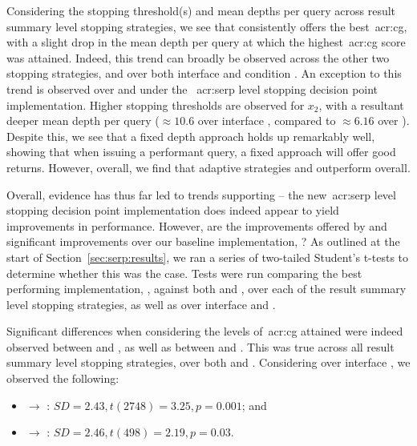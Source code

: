 Considering the stopping threshold(s) and mean depths per query across result summary level stopping strategies, we see that  consistently offers the best~\gls{acr:cg}, with a slight drop in the mean depth per query at which the highest~\gls{acr:cg} score was attained. Indeed, this trend can broadly be observed across the other two stopping strategies, and over both interface  and condition . An exception to this trend is observed over  and  under the ~\gls{acr:serp} level stopping decision point implementation. Higher stopping thresholds are observed for $x_2$, with a resultant deeper mean depth per query ($\approx10.6$ over interface , compared to $\approx6.16$ over ). Despite this, we see that a fixed depth approach holds up remarkably well, showing that when issuing a performant query, a fixed approach will offer good returns. However, overall, we find that adaptive strategies  and  outperform  overall.

Overall, evidence has thus far led to trends supporting  -- the new~\gls{acr:serp} level stopping decision point implementation does indeed appear to yield improvements in performance. However, are the improvements offered by  and  significant improvements over our baseline implementation, ? As outlined at the start of Section~\ref{sec:serp:results}, we ran a series of two-tailed Student's t-tests to determine whether this was the case. Tests were run comparing the best performing implementation, , against both  and , over each of the result summary level stopping strategies, as well as over interface  and .

Significant differences when considering the levels of~\gls{acr:cg} attained were indeed observed between  and , as well as between  and . This was true across all result summary level stopping strategies, over both  and . Considering  over interface , we observed the following:

\begin{itemize}
    \item{ $\rightarrow$ : $SD=2.43, t(2748)=3.25, p=0.001$; and}
    \item{ $\rightarrow$ : $SD=2.46, t(498)=2.19, p=0.03$.}
\end{itemize}

